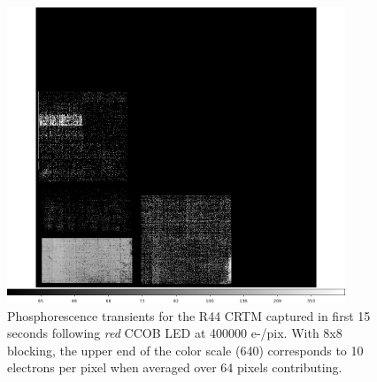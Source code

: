 \begin{figure}[htbp]
\centering
\includegraphics[width=0.9\textwidth]{sections/figures/phosphorescence-survey/itl_fluor_R44_0-19_rb1_log.png}
\caption{Phosphorescence transients for the R44 CRTM captured in first 15 seconds following {\it red} CCOB LED at 400000 e-/pix. With 8x8 blocking, the upper end of the color scale (640) corresponds to 10 electrons per pixel when averaged over 64 pixels contributing.}
\label{fig:phos:R44}
\end{figure}
